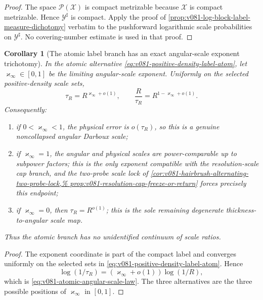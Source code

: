 \documentclass[10pt]{article}
\newtheorem{corollary}[theorem]{Corollary}
\begin{document}
\begin{proof}
The space \(\mathcal P(\mathcal X)\) is compact metrizable because \(\mathcal X\) is compact
metrizable.  Hence \(\mathcal Y^\sharp\) is compact.  Apply the proof of
\cref{prop:v081-log-block-label-measure-dichotomy} verbatim to the pushforward logarithmic scale
probabilities on \(\mathcal Y^\sharp\).  No covering-number estimate is used in that proof.
\end{proof}

\begin{corollary}[The atomic label branch has an exact angular-scale exponent trichotomy]
\label{cor:v081-atomic-angular-scale-trichotomy}
In the atomic alternative
\eqref{eq:v081-positive-density-label-atom}, let
\(\varkappa_\infty\in[0,1]\) be the limiting angular-scale exponent.  Uniformly on the selected
positive-density scale sets,
\begin{equation}
\label{eq:v081-atomic-angular-scale-law}
\boxed{
\tau_R
=
R^{\varkappa_\infty+o(1)},
\qquad
\frac R{\tau_R}
=
R^{1-\varkappa_\infty+o(1)}.
}
\end{equation}
Consequently:
\begin{enumerate}[label=\textnormal{(\roman*)}]
\item if \(0<\varkappa_\infty<1\), the physical error is \(o(\tau_R)\), so this is a genuine
noncollapsed angular Darboux scale;
\item if \(\varkappa_\infty=1\), the angular and physical scales are power-comparable up to
subpower factors; this is the only exponent compatible with the resolution-scale cap branch, and
the two-probe scale lock of
\cref{cor:v081-hairbrush-alternating-two-probe-lock,%
prop:v081-resolution-cap-freeze-or-return} forces precisely this endpoint;
\item if \(\varkappa_\infty=0\), then
\(\tau_R=R^{o(1)}\); this is the sole remaining degenerate thickness-to-angular scale map.
\end{enumerate}
Thus the atomic branch has no unidentified continuum of scale ratios.
\end{corollary}

\begin{proof}
The exponent coordinate is part of the compact label and converges uniformly on the selected
sets in \eqref{eq:v081-positive-density-label-atom}.  Hence
\[
\log(1/\tau_R)
=
(\varkappa_\infty+o(1))\log(1/R),
\]
which is \eqref{eq:v081-atomic-angular-scale-law}.  The three alternatives are the three possible
positions of \(\varkappa_\infty\) in \([0,1]\).
\end{proof}
\end{document}
